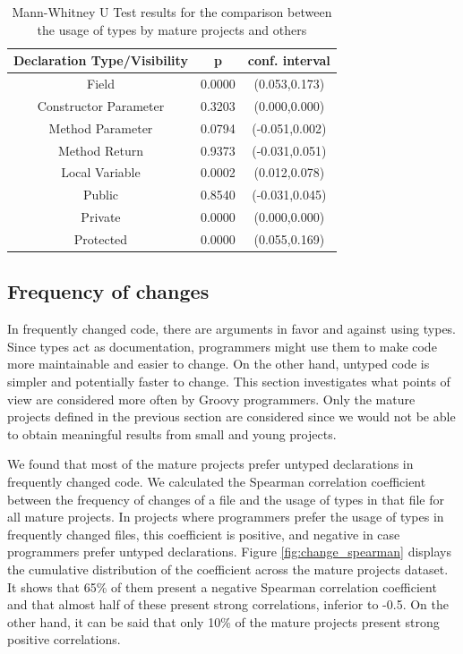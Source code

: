 \documentclass[preprint]{sigplanconf}
\begin{document}
\begin{table}[h!]
\centering{}%
\begin{tabular}{|c|c|c|}
\hline 
Declaration Type/Visibility 		& p & conf. interval \\
\hline 
\hline 
Field                  & 0.0000	& (0.053,0.173)	\\ \hline
Constructor Parameter  & 0.3203	& (0.000,0.000) \\ \hline
Method Parameter       & 0.0794	& (-0.051,0.002) \\ \hline
Method Return          & 0.9373	& (-0.031,0.051) \\ \hline
Local Variable         & 0.0002	& (0.012,0.078)	\\ \hline
\hline 
Public		& 0.8540	& (-0.031,0.045)	\\ \hline
Private		& 0.0000	& (0.000,0.000)		\\ \hline
Protected	& 0.0000	& (0.055,0.169)		\\ 
\hline 
\end{tabular}
\label{tab:size_utest_type+visibility}
\caption{Mann-Whitney U Test results for the comparison between the usage of types by mature projects and others}
\end{table}	





\subsection{Frequency of changes\label{res-changes}}

In frequently changed code, there are arguments in favor and against using types.
Since types act as documentation, programmers might use them to make code more maintainable and easier to change.
On the other hand, untyped code is simpler and potentially faster to change.
This section investigates what points of view are considered more often by Groovy programmers.
Only the mature projects defined in the previous section are considered since we would not be able to obtain meaningful results from small and young projects.

We found that most of the mature projects prefer untyped declarations in frequently changed code.
We calculated the Spearman correlation coefficient between the frequency of changes of a file and the usage of types in that file for all mature projects.
In projects where programmers prefer the usage of types in frequently changed files, this coefficient is positive, and negative in case programmers prefer untyped declarations.
Figure \ref{fig:change_spearman} displays the cumulative distribution of the coefficient across the mature projects dataset.
It shows that 65\% of them present a negative Spearman correlation coefficient and that almost half of these present strong correlations, inferior to -0.5.
On the other hand, it can be said that only 10\% of the mature projects present strong positive correlations.
\end{document}
